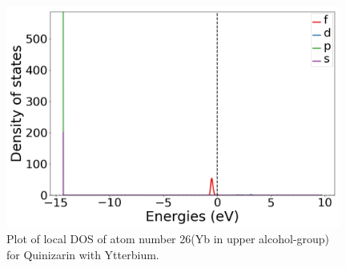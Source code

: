 \documentclass{article}
\begin{document}
  \begin{figure}[H]
      \centering
      \includegraphics[width = 11cm]{../fig/Yb_LDOS26_1.png}
      \caption{Plot of local DOS of atom number 26(Yb in upper alcohol-group) for Quinizarin with Ytterbium. }
      \label{fig:Yb_LDOS26_1}
  \end{figure}


\end{document}
